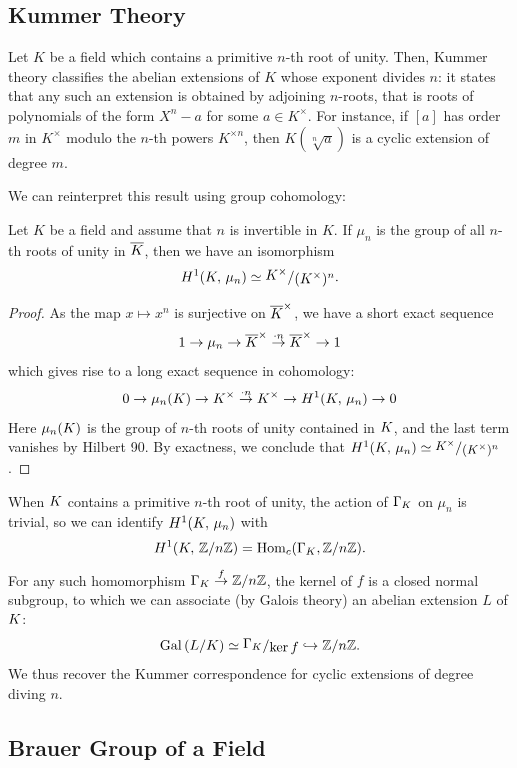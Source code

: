 \documentclass[a4paper, oneside]{memoir}
\begin{document}
\subsection{Kummer Theory}

Let $K$ be a field which contains a primitive $n$-th root of unity. Then, Kummer theory classifies the abelian extensions of $K$ whose exponent divides $n$: it states that any such an extension is obtained by adjoining $n$-roots, that is roots of polynomials of the form $X^n-a$ for some $a\in K^\times$. For instance, if $[a]$ has order $m$ in $K^\times$ modulo the $n$-th powers $K^{\times n}$, then $K(\sqrt[n]{a})$ is a cyclic extension of degree $m$.

We can reinterpret this result using group cohomology:
\begin{proposition}\label{prop:Kummer}
	Let $K$ be a field and assume that $n$ is invertible in $K$.
	If $\mu_n$ is the group of all $n$-th roots of unity in $\overline{K}$, then we have an isomorphism
	\[
		\H{1}{\K}{\mu_n}\simeq \ssfrac{\K^\times}{(\K^\times)^n}.
	\]
\end{proposition}

\begin{proof}
	As the map $x\mapsto x^n$ is surjective on $\overline{K}^\times$, we have a short exact sequence
	\[
		1\to \mu_n\to \overline{K}^\times\overset{\cdot n}{\to} \overline{K}^\times\to 1
	\]
	which gives rise to a long exact sequence in cohomology:
	\[
		0\to \mu_n(K)\to K^\times \overset{\cdot n}{\to} K^\times \to H^{1}( K, \, \mu_n )\to 0
	\]
	Here $\mu_n(K)$ is the group of $n$-th roots of unity contained in $K$, and the last term vanishes by Hilbert 90. By exactness, we conclude that $\H{1}{\K}{\mu_n}\simeq \sfrac{\K^\times}{(\K^\times)^n}$.
\end{proof}

\begin{remark}
	When $K$ contains a primitive $n$-th root of unity, the action of $\Gamma_K$ on $\mu_n$ is trivial, so we can identify $H^{1}( K, \, \mu_n )$ with \[H^{1}( K, \, \mathbb{Z}/n\mathbb{Z} )=\operatorname{Hom}_{c}(\Gamma_K,\mathbb{Z}/n\mathbb{Z}).\]
	For any such homomorphism $\Gamma_K\overset{f}{\to}\mathbb{Z}/n\mathbb{Z}$, the kernel of $f$ is a closed normal subgroup, to which we can associate (by Galois theory) an abelian extension $L$ of $K$:
	\[
		\operatorname{Gal}{(L/\K)}\simeq \ssfrac{\Gamma_\K}{\ker{f}}\hookrightarrow \Zn.
	\]
	We thus recover the Kummer correspondence for cyclic extensions of degree diving $n$.
\end{remark}

\subsection{Brauer Group of a Field}
\end{document}
